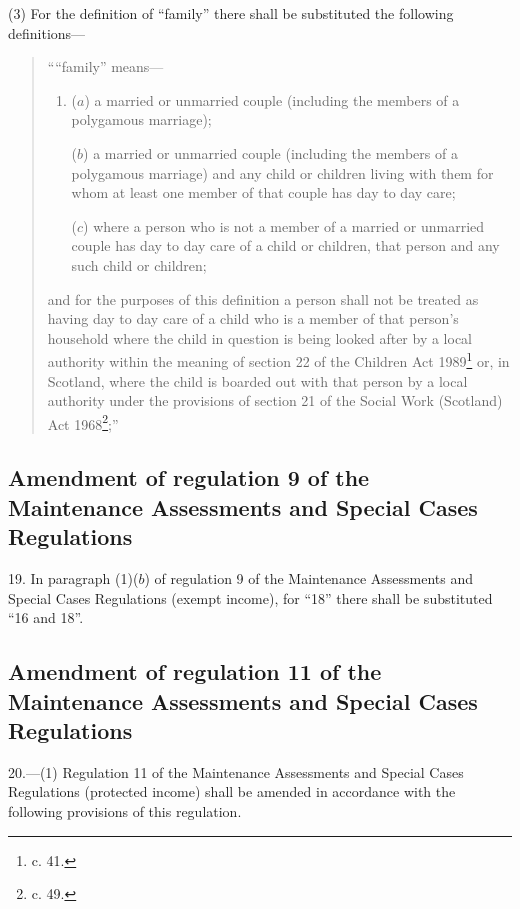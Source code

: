 \documentclass[a4paper]{article}
\begin{document}
(3) For the definition of “family” there shall be substituted the following definitions—
\begin{quotation}
““family” means—
\begin{enumerate}\item[]
($a$) a married or unmarried couple (including the members of a polygamous marriage);

($b$) a married or unmarried couple (including the members of a polygamous marriage) and any child or children living with them for whom at least one member of that couple has day to day care;

($c$) where a person who is not a member of a married or unmarried couple has day to day care of a child or children, that person and any such child or children;
\end{enumerate}
and for the purposes of this definition a person shall not be treated as having day to day care of a child who is a member of that person’s household where the child in question is being looked after by a local authority within the meaning of section 22 of the Children Act 1989\footnote{ c. 41.} or, in Scotland, where the child is boarded out with that person by a local authority under the provisions of section 21 of the Social Work (Scotland) Act 1968\footnote{ c. 49.};”
\end{quotation}

\subsection[19. Amendment of regulation 9 of the Maintenance Assessments and Special Cases Regulations]{Amendment of regulation 9 of the Maintenance Assessments and Special Cases Regulations}

19.  In paragraph (1)($b$) of regulation 9 of the Maintenance Assessments and Special Cases Regulations (exempt income), for “18” there shall be substituted “16 and 18”.

\subsection[20. Amendment of regulation 11 of the Maintenance Assessments and Special Cases Regulations]{Amendment of regulation 11 of the Maintenance Assessments and Special Cases Regulations}

20.—(1) Regulation 11 of the Maintenance Assessments and Special Cases Regulations (protected income) shall be amended in accordance with the following provisions of this regulation.
\end{document}
